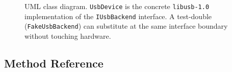 \begin{figure}[h!]
\caption{UML class diagram. \texttt{UsbDevice} is the concrete
         \texttt{libusb-1.0} implementation of the \texttt{IUsbBackend}
         interface. A test-double (\texttt{FakeUsbBackend}) can substitute
         at the same interface boundary without touching hardware.}
\end{figure}

\clearpage

\subsection*{Method Reference}

